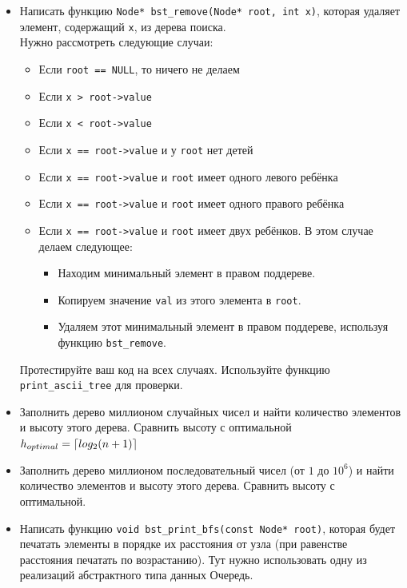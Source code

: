 \documentclass{article}
\DeclarePairedDelimiter\ceil{\lceil}{\rceil}
\begin{document}
\begin{itemize}
\item Написать функцию \texttt{Node* bst\_remove(Node* root, int x)}, которая удаляет элемент, содержащий \texttt{x}, из дерева поиска.\\
Нужно рассмотреть следующие случаи:
\begin{itemize}
\item Если \texttt{root == NULL}, то ничего не делаем
\item Если \texttt{x > root->value}
\item Если \texttt{x < root->value}
\item Если \texttt{x == root->value} и у \texttt{root} нет детей
\item Если \texttt{x == root->value} и \texttt{root} имеет одного левого ребёнка
\item Если \texttt{x == root->value} и \texttt{root} имеет одного правого ребёнка
\item Если \texttt{x == root->value} и \texttt{root} имеет двух ребёнков. В этом случае делаем следующее:
	\begin{itemize}
	\item Находим минимальный элемент в правом поддереве.
	\item Копируем значение \texttt{val} из этого элемента в \texttt{root}.
	\item Удаляем этот минимальный элемент в правом поддереве, используя функцию \texttt{bst\_remove}.
	\end{itemize}
\end{itemize}
Протестируйте ваш код на всех случаях. Используйте функцию \texttt{print\_ascii\_tree} для проверки.

\item Заполнить дерево миллионом случайных чисел и найти количество элементов и высоту этого дерева. Сравнить высоту с оптимальной $h_{optimal} = \ceil*{log_2(n + 1)}$
\item Заполнить дерево миллионом последовательный чисел (от $1$ до $10^6$) и найти количество элементов и высоту этого дерева. Сравнить высоту с оптимальной.

\item Написать функцию \texttt{void bst\_print\_bfs(const Node* root)}, которая будет печатать элементы в порядке их расстояния от узла (при равенстве расстояния печатать по возрастанию). Тут нужно использовать одну из реализаций абстрактного типа данных Очередь.
\end{itemize}
\newpage
\end{document}
